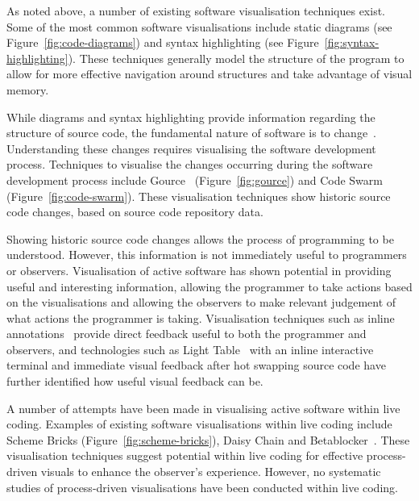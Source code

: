   

As noted above, a number of existing software visualisation techniques exist. Some of the most common software visualisations include static diagrams (see Figure~\ref{fig:code-diagrams}) and syntax highlighting (see Figure~\ref{fig:syntax-highlighting}). These techniques generally model the structure of the program to allow for more effective navigation around structures and take advantage of visual memory.

While diagrams and syntax highlighting provide information regarding the structure of source code, the fundamental nature of software is to change~\cite{Brooks1995}. Understanding these changes requires visualising the software development process. Techniques to visualise the changes occurring during the software development process include Gource~\cite{Caudwell2010} (Figure~\ref{fig:gource}) and Code Swarm~\cite{Ogawa2012} (Figure~\ref{fig:code-swarm}). These visualisation techniques show historic source code changes, based on source code repository data.

Showing historic source code changes allows the process of programming to be understood. However, this information is not immediately useful to programmers or observers. Visualisation of active software has shown potential in providing useful and interesting information, allowing the programmer to take actions based on the visualisations and allowing the observers to make relevant judgement of what actions the programmer is taking. Visualisation techniques such as inline annotations~\cite{Swift2013,Beck2013} provide direct feedback useful to both the programmer and observers, and technologies such as Light Table~\cite{Kodowa2014} with an inline interactive terminal and immediate visual feedback after hot swapping source code have further identified how useful visual feedback can be.

A number of attempts have been made in visualising active software within live coding. Examples of existing software visualisations within live coding include Scheme Bricks (Figure~\ref{fig:scheme-bricks}), Daisy Chain and Betablocker~\cite{McLean2010a}. These visualisation techniques suggest potential within live coding for effective process-driven visuals to enhance the observer's experience. However, no systematic studies of process-driven visualisations have been conducted within live coding.


